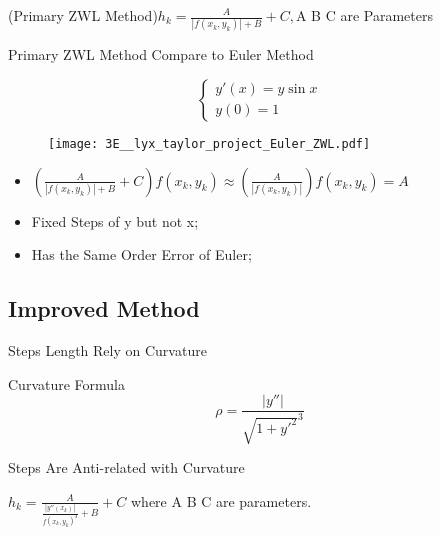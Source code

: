 \documentclass[english]{beamer}
\def\lyxframeend{} %
\begin{document}
\lyxframeend{}
\begin{theorem}%
(Primary ZWL Method)$h_{k}=\frac{A}{\left|f(x_{k},y_{k})\right|+B}+C,$A
B C are Parameters\end{theorem}%
\begin{fact}%
Primary ZWL Method Compare to Euler Method
\end{fact}%

\lyxframeend{}

\[
\left\{ \begin{array}{ll}
y'(x)=y\sin x\\
y(0)=1
\end{array}\right.
\]


\begin{figure}
\caption{\protect\texttt{[image: 3E\_\_lyx\_taylor\_project\_Euler\_ZWL.pdf]}}
\end{figure}



\lyxframeend{}
\begin{itemize}
\item <1->$\left(\frac{A}{\left|f(x_{k},y_{k})\right|+B}+C\right)f(x_{k},y_{k})$$\approx\left(\frac{A}{|f(x_{k},y_{k})|}\right)f({x_{k}},{y_{k}})=A$
\item <2->Fixed Steps of y but not x;
\item <3->Has the Same Order Error of Euler; 
\end{itemize}

\lyxframeend{}\subsection{Improved Method}


\lyxframeend{}
\begin{fact}%
Steps Length Rely on Curvature
\end{fact}%
Curvature Formula 
\[
\rho=\frac{|y''|}{\sqrt{1+y'^{2}}^{3}}
\]

\begin{corollary}%
Steps Are Anti-related with Curvature\end{corollary}%
\begin{theorem}%
$h_{k}=\frac{A}{\frac{|y''(x_{k})|}{f(x_{k},y_{k})^{3}}+B}+C$ where
A B C are parameters.
\end{theorem}%

\lyxframeend{}
\end{document}
